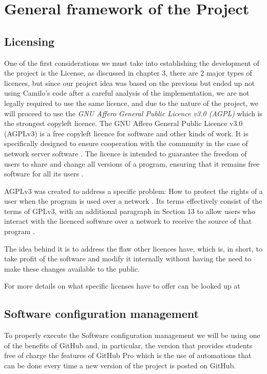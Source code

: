 
\section{General framework of the Project}

\subsection{Licensing}
One of the first considerations we must take into establishing the development of the project is the License, as discussed in chapter 3, there are 2 major types of licences, but since our project idea was based on the previous but ended up not using Camilo's code after a careful analysis of the implementation, we are not legally required to use the same licence, and due to the nature of the project, we will proceed to use the \textit{GNU Affero General Public Licence v3.0 (AGPL)} which is the strongest copyleft licence. The GNU Affero General Public Licence v3.0 (AGPLv3) is a free copyleft licence for software and other kinds of work. It is specifically designed to ensure cooperation with the community in the case of network server software \cite{fsf1}. The licence is intended to guarantee the freedom of users to share and change all versions of a program, ensuring that it remains free software for all its users \cite{fsf1}.


 AGPLv3 was created to address a specific problem: How to protect the rights of a user when the program is used over a network \cite{fsf2}. Its terms effectively consist of the terms of GPLv3, with an additional paragraph in Section 13 to allow users who interact with the licenced software over a network to receive the source of that program \cite{fsf3}. 


The idea behind it is to address the flaw other licences have, which is, in short, to take profit of the software and modify it internally without having the need to make these changes available to the public.


For more details on what specific licenses have to offer can be looked up at \cite{choosealicense}\cite{opensourceorg}

\subsection{Software configuration management}
To properly execute the Software configuration management we will be using one of the benefits of GitHub and, in particular, the version that provides students free of charge the features of GitHub Pro which is the use of automations that can be done every time a new version of the project is posted on GitHub.

